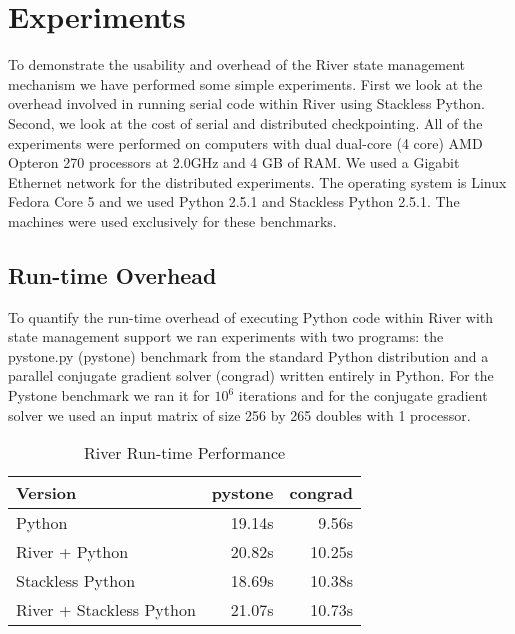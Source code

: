 \section{Experiments}
\label{sec:Experiments}

To demonstrate the usability and overhead of the River state management mechanism we have performed some simple experiments.  First we look at the overhead involved in running serial code within River using Stackless Python.  Second, we look at the cost of serial and distributed checkpointing.  All of the experiments were performed on computers with dual dual-core (4 core) AMD Opteron 270 processors at 2.0GHz and 4 GB of RAM.  We used a Gigabit Ethernet network for the distributed experiments.  The operating system is Linux Fedora Core 5 and we used Python 2.5.1 and Stackless Python 2.5.1.  The machines were used exclusively for these benchmarks.

\subsection{Run-time Overhead}

To quantify the run-time overhead of executing Python code within River with state management support we ran experiments with two programs: the pystone.py (pystone) benchmark from the standard Python distribution and a parallel conjugate gradient solver (congrad) written entirely in Python.  For the Pystone benchmark we ran it for $10^6$ iterations and for the conjugate gradient solver we used an input matrix of size 256 by 265 doubles with 1 processor.

\begin{table} [htb]
\begin{center}
\begin{tabular}{|l|r|r|}  \hline
Version                  &  pystone  &  congrad  \\ \hline\hline
Python                   &    19.14s &    9.56s  \\ \hline
River + Python           &    20.82s &   10.25s  \\ \hline
Stackless Python         &    18.69s &   10.38s  \\ \hline
River + Stackless Python &    21.07s &   10.73s  \\ \hline
\end{tabular}
\end{center}
\caption{River Run-time Performance}
\label{tab:overhead}
\end{table}

